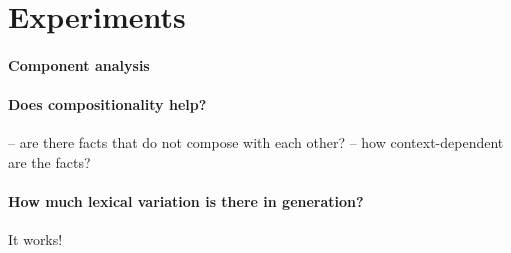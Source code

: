 \section{Experiments}

\paragraph{Component analysis}

\paragraph{Does compositionality help?}

-- are there facts that do not compose with each other?
-- how context-dependent are the facts?

\paragraph{How much lexical variation is there in generation?}


It works!
